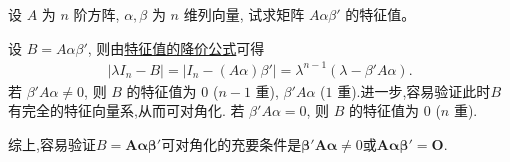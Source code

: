 \documentclass[../../main.tex]{subfiles}
\begin{document}
\begin{example}\label{example-6.10}
设 $A$ 为 $n$ 阶方阵, $\alpha, \beta$ 为 $n$ 维列向量, 试求矩阵 $A \alpha \beta'$ 的特征值。
\end{example}
\begin{solution}
设 $B = A \alpha \beta'$, 则由\hyperref[theorem:特征值的降价公式]{特征值的降价公式}可得
\begin{align*}
| \lambda I_n - B | 
= | I_n - (A \alpha) \beta' | 
= \lambda^{n-1} (\lambda - \beta' A \alpha).
\end{align*}
若 $\beta' A \alpha \neq 0$, 则 $B$ 的特征值为 $0$ ($n-1$ 重), $\beta' A \alpha$ ($1$ 重).进一步,容易验证此时$B$有完全的特征向量系,从而可对角化.
若 $\beta' A \alpha = 0$, 则 $B$ 的特征值为 $0$ ($n$ 重).

综上,容易验证\(B=\boldsymbol{A}\boldsymbol{\alpha}\boldsymbol{\beta}'\)可对角化的充要条件是\(\boldsymbol{\beta}'\boldsymbol{A}\boldsymbol{\alpha}\neq 0\)或\(\boldsymbol{A}\boldsymbol{\alpha}\boldsymbol{\beta}' = \boldsymbol{O}\).

\end{solution}
\end{document}
